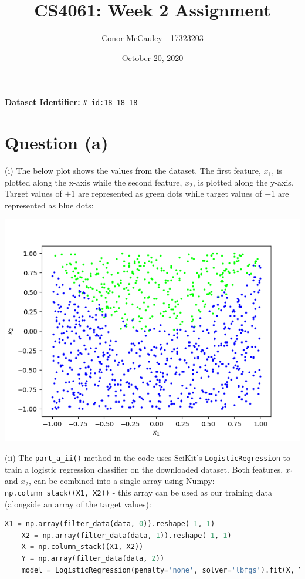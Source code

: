 \documentclass[12pt]{article}
\title{CS4061: Week 2 Assignment}
\author{Conor McCauley - 17323203}
\date{October 20, 2020}
\begin{document}
\maketitle

\noindent \textbf{Dataset Identifier:} \texttt{\# id:18--18-18 }

\section*{Question (a)}

\noindent (i) The below plot shows the values from the dataset. The first feature, $x_1$, is plotted along the x-axis while the second feature, $x_2$, is plotted along the y-axis. Target values of $+1$ are represented as green dots while target values of $-1$ are represented as blue dots:

\begin{center}
    \includegraphics[scale=0.6]{fig_1.png}
\end{center}

\noindent (ii) The \texttt{part\_a\_ii()} method in the code uses SciKit's \texttt{LogisticRegression} to train a logistic regression classifier on the downloaded dataset. Both features, $x_1$ and $x_2$, can be combined into a single array using Numpy: \texttt{np.column\_stack((X1, X2))} - this array can be used as our training data (alongside an array of the target values):

\begin{center}
    \lstset{basicstyle=\footnotesize}
    \begin{lstlisting}[language=Python]
    X1 = np.array(filter_data(data, 0)).reshape(-1, 1)
    X2 = np.array(filter_data(data, 1)).reshape(-1, 1)
    X = np.column_stack((X1, X2))
    Y = np.array(filter_data(data, 2))
    model = LogisticRegression(penalty='none', solver='lbfgs').fit(X, Y)
    \end{lstlisting}
\end{center}
\end{document}
